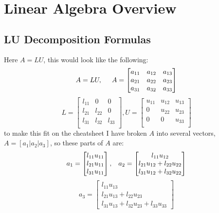 \section{Linear Algebra Overview}

\subsection*{LU Decomposition Formulas}
Here $A = LU$, this would look like the following:
\[
A = LU, \hspace{5mm}
A =
\begin{bmatrix}
  a_{11} & a_{12} & a_{13} \\
  a_{21} & a_{22} & a_{23} \\
  a_{31} & a_{32} & a_{33} \\
\end{bmatrix}
\]
\[
L =
\begin{bmatrix}
  l_{11} & 0 & 0 \\
  l_{21} & l_{22} & 0 \\
  l_{31} & l_{32} & l_{33} \\
\end{bmatrix},
U =
\begin{bmatrix}
  u_{11} & u_{12} & u_{13} \\
  0 & u_{22} & u_{23} \\
  0 & 0 & u_{33} \\
\end{bmatrix}
\]
to make this fit on the cheatsheet I have broken $A$ into several vectors,
$A = [ a_1 | a_2 | a_3 ]$, so these parts of $A$ are:
\newline
$$
a_1 =
\begin{bmatrix}
l_{11} u_{11} \\
l_{21} u_{11} \\
l_{31} u_{11}
\end{bmatrix}
, \hspace{3mm}
a_2 =
\begin{bmatrix}
  l_{11} u_{12} \\
  l_{21} u_{12} + l_{22} u_{22} \\
  l_{31} u_{12} + l_{32} u_{22}
\end{bmatrix}
$$
$$
a_3 =
\begin{bmatrix}
  l_{11} u_{13} \\
  l_{21} u_{13} + l_{22} u_{23} \\
  l_{31} u_{13} + l_{32} u_{23} + l_{33} u_{33}
\end{bmatrix}
$$

